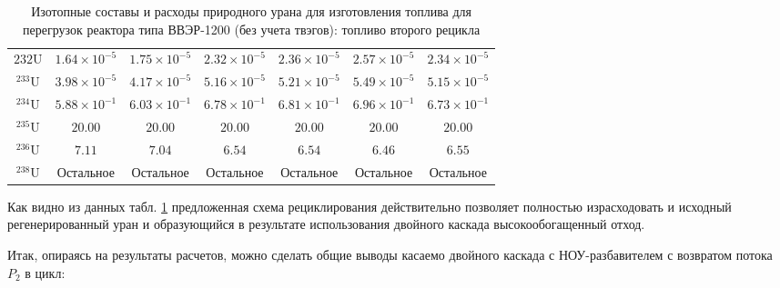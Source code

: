 \begin{table}
\begin{tabular}{|c|c|c|c|c|c|c|}
    \hline $232 \mathrm{U}$ & $1.64 \times 10^{-5}$ & $1.75 \times 10^{-5}$ & $2.32 \times 10^{-5}$ & $2.36 \times 10^{-5}$ & $2.57 \times 10^{-5}$ & $2.34 \times 10^{-5}$ \\
    ${ }^{233} \mathrm{U}$ & $3.98 \times 10^{-5}$ & $4.17 \times 10^{-5}$ & $5.16 \times 10^{-5}$ & $5.21 \times 10^{-5}$ & $5.49 \times 10^{-5}$ & $5.15 \times 10^{-5}$ \\
    ${ }^{234} \mathrm{U}$ & $5.88 \times 10^{-1}$ & $6.03 \times 10^{-1}$ & $6.78 \times 10^{-1}$ & $6.81 \times 10^{-1}$ & $6.96 \times 10^{-1}$ & $6.73 \times 10^{-1}$ \\
    ${ }^{235} \mathrm{U}$ & $20.00$ & $20.00$ & $20.00$ & $20.00$ & $20.00$ & $20.00$ \\
    ${ }^{236} \mathrm{U}$ & $7.11$ & $7.04$ & $6.54$ & $6.54$ & $6.46$ & $6.55$ \\
    ${ }^{238} \mathrm{U}$ & Остальное & Остальное & Остальное & Остальное & Остальное & Остальное \\
    \hline
    \end{tabular}
    \caption{Изотопные составы и расходы природного урана для изготовления топлива для перегрузок реактора
    типа ВВЭР-1200 (без учета твэгов): топливо второго рецикла}\label{vest2019_2}
\end{table}


Как видно из данных табл. \ref{vest2019_2} предложенная схема рециклирования действительно позволяет полностью израсходовать и исходный регенерированный уран и образующийся в результате использования двойного каскада высокообогащенный отход.

Итак, опираясь на результаты расчетов, можно сделать общие выводы касаемо двойного каскада с НОУ-разбавителем с возвратом потока $P_2$ в цикл:

